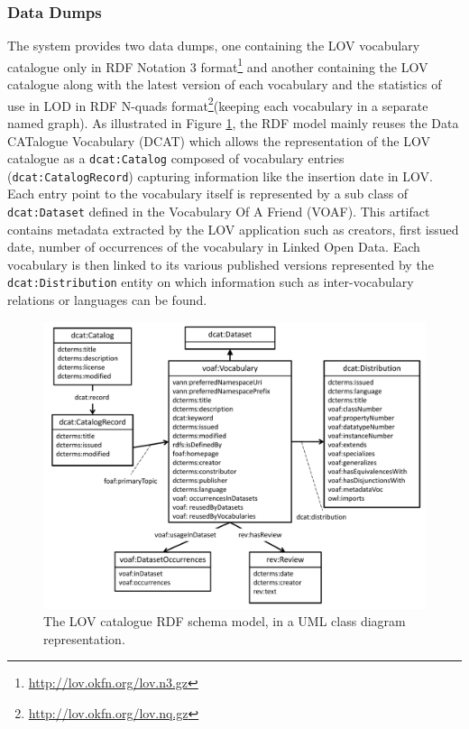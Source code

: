 \documentclass{iosart2c}
\begin{document}
\subsubsection{Data Dumps}
The system provides two data dumps, one containing the LOV vocabulary catalogue only in RDF Notation 3 format\footnote{\url{http://lov.okfn.org/lov.n3.gz}} and another containing the LOV catalogue along with the latest version of each vocabulary and the statistics of use in LOD in RDF N-quads format\footnote{\url{http://lov.okfn.org/lov.nq.gz}}(keeping each vocabulary in a separate named graph). As illustrated in Figure \ref{fig:model}, the RDF model mainly reuses the Data CATalogue Vocabulary (DCAT) which allows the representation of the LOV catalogue as a {\small\texttt{dcat:Catalog}} composed of vocabulary entries ({\small\texttt{dcat:CatalogRecord}}) capturing information like the insertion date in LOV. Each entry point to the vocabulary itself is represented by a sub class of {\small\texttt{dcat:Dataset}} defined in the Vocabulary Of A Friend (VOAF). This artifact contains metadata extracted by the LOV application such as creators, first issued date, number of occurrences of the vocabulary in Linked Open Data. Each vocabulary is then linked to its various published versions represented by the {\small\texttt{dcat:Distribution}} entity on which information such as inter-vocabulary relations or languages can be found.

\begin{figure}[!htb]
\includegraphics[width=.9\textwidth]{LOV_model.pdf}
\caption{The LOV catalogue RDF schema model, in a UML class diagram representation.}
\label{fig:model}
\end{figure}
\end{document}
